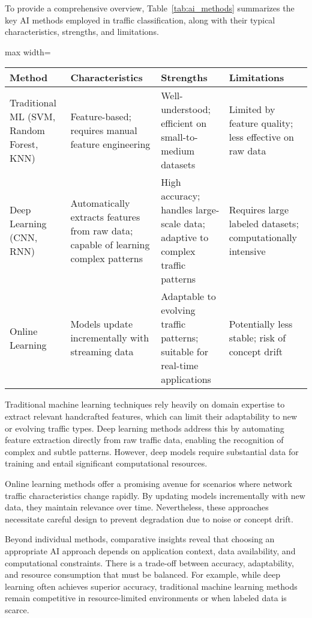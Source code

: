 \documentclass[sigconf]{acmart}
\begin{document}
To provide a comprehensive overview, Table~\ref{tab:ai_methods} summarizes the key AI methods employed in traffic classification, along with their typical characteristics, strengths, and limitations.

\begin{table*}[htbp]
\centering
\caption{Summary of AI Methods for Network Traffic Classification}
\label{tab:ai_methods}
\begin{adjustbox}{max width=\textwidth}
\begin{tabular}{@{}llll@{}}
\toprule
\textbf{Method} & \textbf{Characteristics} & \textbf{Strengths} & \textbf{Limitations} \\
\midrule
Traditional ML (SVM, Random Forest, KNN) & Feature-based; requires manual feature engineering & Well-understood; efficient on small-to-medium datasets & Limited by feature quality; less effective on raw data \\
Deep Learning (CNN, RNN) & Automatically extracts features from raw data; capable of learning complex patterns & High accuracy; handles large-scale data; adaptive to complex traffic patterns & Requires large labeled datasets; computationally intensive \\
Online Learning & Models update incrementally with streaming data & Adaptable to evolving traffic patterns; suitable for real-time applications & Potentially less stable; risk of concept drift \\
\bottomrule
\end{tabular}
\end{adjustbox}
\end{table*}

Traditional machine learning techniques rely heavily on domain expertise to extract relevant handcrafted features, which can limit their adaptability to new or evolving traffic types. Deep learning methods address this by automating feature extraction directly from raw traffic data, enabling the recognition of complex and subtle patterns. However, deep models require substantial data for training and entail significant computational resources.

Online learning methods offer a promising avenue for scenarios where network traffic characteristics change rapidly. By updating models incrementally with new data, they maintain relevance over time. Nevertheless, these approaches necessitate careful design to prevent degradation due to noise or concept drift.

Beyond individual methods, comparative insights reveal that choosing an appropriate AI approach depends on application context, data availability, and computational constraints. There is a trade-off between accuracy, adaptability, and resource consumption that must be balanced. For example, while deep learning often achieves superior accuracy, traditional machine learning methods remain competitive in resource-limited environments or when labeled data is scarce.
\end{document}
